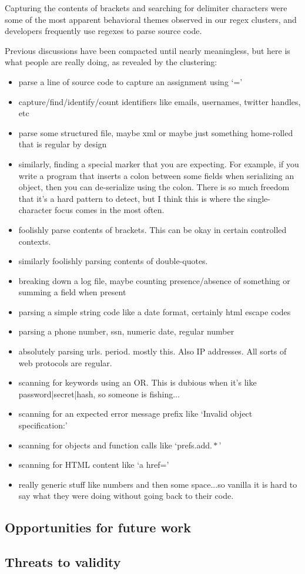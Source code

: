 Capturing the contents of brackets and searching for delimiter characters were some of the most apparent  behavioral themes observed in our regex clusters, and developers frequently use regexes to parse source code.

  Previous discussions have been compacted until nearly meaningless, but here is what people are really doing, as revealed by the clustering:
\begin{itemize}
\item parse a line of source code to capture an assignment using `='
\item capture/find/identify/count identifiers like emails, usernames, twitter handles, etc
\item parse some structured file, maybe xml or maybe just something home-rolled that is regular by design
\item similarly, finding a special marker that you are expecting.  For example, if you write a program that inserts a colon between some fields when serializing an object, then you can de-serialize using the colon.  There is so much freedom that it's a hard pattern to detect, but I think this is where the single-character focus comes in the most often.
\item foolishly parse contents of brackets.  This can be okay in certain controlled contexts.
\item similarly foolishly parsing contents of double-quotes.
\item breaking down a log file, maybe counting presence/absence of something or summing a field when present
\item parsing a simple string code like a date format, certainly html escape codes
\item parsing a phone number, ssn, numeric date, regular number
\item absolutely parsing urls. period.  mostly this.  Also IP addresses.  All sorts of web protocols are regular.
\item scanning for keywords using an OR.  This is dubious when it's like password|secret|hash, so someone is fishing...
\item scanning for an expected error message prefix like `Invalid object specification:'
\item scanning for objects and function calls like `prefs.add\(.*\)'
\item scanning for HTML content like `a href='
\item really generic stuff like numbers and then some space...so vanilla it is hard to say what they were doing without going back to their code.
\end{itemize}


\subsection{Opportunities for future work}
\subsection{Threats to validity}
